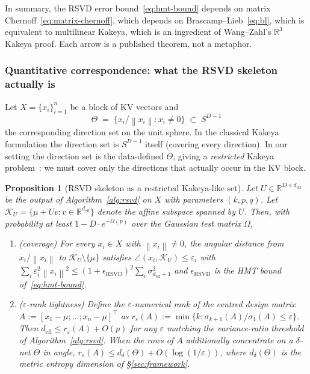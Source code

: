 \documentclass[11pt,a4paper]{article}
\theoremstyle{definition}
\theoremstyle{plain}
\newtheorem{proposition}[theorem]{Proposition}
\newcommand{\R}{\mathbb{R}}
\newcommand{\norm}[1]{\left\lVert#1\right\rVert}
\begin{document}
In summary, the RSVD error bound~\eqref{eq:hmt-bound} depends on matrix Chernoff~\eqref{eq:matrix-chernoff}, which depends on Brascamp--Lieb~\eqref{eq:bl}, which is equivalent to multilinear Kakeya, which is an ingredient of Wang--Zahl's $\R^3$ Kakeya proof. Each arrow is a published theorem, not a metaphor.

\subsubsection*{Quantitative correspondence: what the RSVD skeleton actually is}

Let $X = \{x_i\}_{i=1}^n$ be a block of KV vectors and
\[
\Theta \;=\; \{x_i / \norm{x_i} : x_i \neq 0\} \;\subset\; S^{D-1}
\]
the corresponding direction set on the unit sphere. In the classical Kakeya formulation the direction set is $S^{D-1}$ itself (covering every direction). In our setting the direction set is the data-defined $\Theta$, giving a \emph{restricted} Kakeya problem~\cite{wolff-kakeya}: we must cover only the directions that actually occur in the KV block.

\begin{proposition}[RSVD skeleton as a restricted Kakeya-like set]
\label{prop:rsvd-skeleton}
Let $U \in \R^{D \times d_{\text{eff}}}$ be the output of Algorithm~\ref{alg:rsvd} on $X$ with parameters $(k, p, q)$. Let $\mathcal{K}_U = \{\mu + Uv : v \in \R^{d_{\text{eff}}}\}$ denote the affine subspace spanned by $U$. Then, with probability at least $1 - D \cdot e^{-\Omega(p)}$ over the Gaussian test matrix $\Omega$,
\begin{enumerate}[label=(\roman*), leftmargin=*]
  \item (\emph{coverage}) For every $x_i \in X$ with $\norm{x_i} \neq 0$, the angular distance from $x_i / \norm{x_i}$ to $\mathcal{K}_U \setminus \{\mu\}$ satisfies $\angle(x_i, \mathcal{K}_U) \leq \varepsilon_i$ with $\sum_i \varepsilon_i^2 \norm{x_i}^2 \leq (1 + \epsilon_{\text{RSVD}})^2 \sum_i \sigma_{d_{\text{eff}}+1}^2$ and $\epsilon_{\text{RSVD}}$ is the HMT bound of~\eqref{eq:hmt-bound}.
  \item (\emph{$\varepsilon$-rank tightness}) Define the $\varepsilon$-numerical rank of the centred design matrix $A := [x_1 - \mu; \ldots; x_n - \mu]^\top$ as $r_\varepsilon(A) := \min\{k : \sigma_{k+1}(A) / \sigma_1(A) \leq \varepsilon\}$. Then $d_{\text{eff}} \leq r_\varepsilon(A) + O(p)$ for any $\varepsilon$ matching the variance-ratio threshold of Algorithm~\ref{alg:rsvd}. When the rows of $A$ additionally concentrate on a $\delta$-net $\Theta$ in angle, $r_\varepsilon(A) \leq d_\delta(\Theta) + O(\log(1/\varepsilon))$, where $d_\delta(\Theta)$ is the metric entropy dimension of \S\ref{sec:framework}.
\end{enumerate}
\end{proposition}
\end{document}
